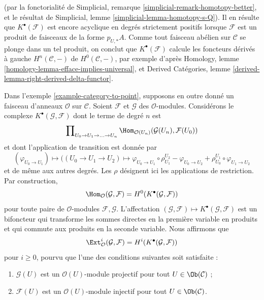 \begin{example}
(par la fonctorialité de Simplicial, remarque
\ref{simplicial-remark-homotopy-better}, et le résultat de Simplicial, lemme
\ref{simplicial-lemma-homotopy-s-Q}). Il en résulte que
$K^\bullet(\mathcal{F})$ est encore acyclique en degrés strictement positifs
lorsque $\mathcal{F}$ est un produit de faisceaux de la forme $p_{U, *}A$.
Comme tout faisceau abélien sur $\mathcal{C}$ se plonge dans un tel produit,
on conclut que $K^\bullet(\mathcal{F})$ calcule les foncteurs dérivés à gauche
$H^n(\mathcal{C}, -)$ de $H^0(\mathcal{C}, -)$, par exemple d'après
Homology, lemme \ref{homology-lemma-efface-implies-universal}, et Derived
Catégories, lemme \ref{derived-lemma-right-derived-delta-functor}.
\end{example}

\begin{example}
\label{example-computing-exts}
Dans l'exemple \ref{example-category-to-point}, supposons en outre donné un
faisceau d'anneaux $\mathcal{O}$ sur $\mathcal{C}$. Soient $\mathcal{F}$ et
$\mathcal{G}$ des $\mathcal{O}$-modules. Considérons le complexe
$K^\bullet(\mathcal{G}, \mathcal{F})$ dont le terme de degré $n$ est
$$
\prod\nolimits_{U_0 \to U_1 \to \ldots \to U_n}
\Hom_{\mathcal{O}(U_n)}(\mathcal{G}(U_n), \mathcal{F}(U_0))
$$
et dont l'application de transition est donnée par
$$
(\varphi_{U_0 \to U_1})
\longmapsto
((U_0 \to U_1 \to U_2) \mapsto
\varphi_{U_0 \to U_1} \circ \rho^{U_2}_{U_1}
- \varphi_{U_0 \to U_2}
+ \rho^{U_1}_{U_0} \circ \varphi_{U_1 \to U_2}
$$
et de même aux autres degrés. Les $\rho$ désignent ici les applications de
restriction. Par construction,
$$
\Hom_\mathcal{O}(\mathcal{G}, \mathcal{F}) =
H^0(K^\bullet(\mathcal{G}, \mathcal{F}))
$$
pour toute paire de $\mathcal{O}$-modules $\mathcal{F}, \mathcal{G}$.
L'affectation
$(\mathcal{G}, \mathcal{F}) \mapsto K^\bullet(\mathcal{G}, \mathcal{F})$
est un bifoncteur qui transforme les sommes directes en la première variable
en produits et qui commute aux produits en la seconde variable. Nous
affirmons que
$$
\Ext^i_\mathcal{O}(\mathcal{G}, \mathcal{F}) =
H^i(K^\bullet(\mathcal{G}, \mathcal{F}))
$$
pour $i \geq 0$, pourvu que l'une des conditions suivantes soit satisfaite :
\begin{enumerate}
\item $\mathcal{G}(U)$ est un $\mathcal{O}(U)$-module projectif pour tout
$U \in \Ob(\mathcal{C})$ ;
\item $\mathcal{F}(U)$ est un $\mathcal{O}(U)$-module injectif pour tout
$U \in \Ob(\mathcal{C})$.
\end{enumerate}

\end{example}

